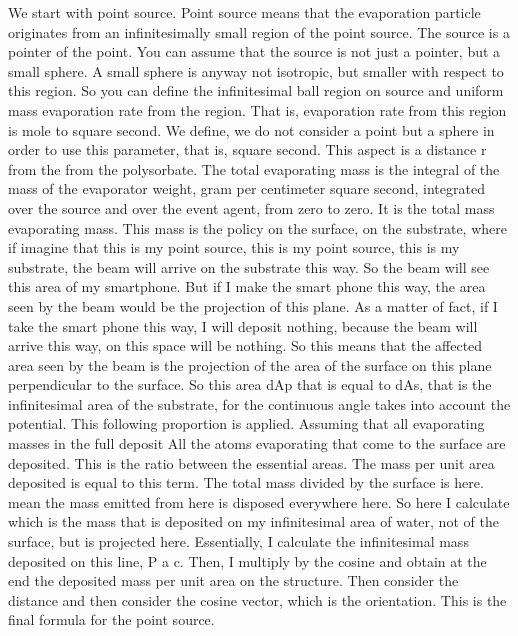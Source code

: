 We start with point source. Point source means that the evaporation particle originates from an infinitesimally small region of the point source. The source is a pointer of the point. You can assume that the source is not just a pointer, but a small sphere. A small sphere is anyway not isotropic, but smaller with respect to this region. So you can define the infinitesimal ball region on source and uniform mass evaporation rate from the region. That is, evaporation rate from this region is mole to square second. We define, we do not consider a point but a sphere in order to use this parameter, that is, square second. This aspect is a distance r from the from the polysorbate. The total evaporating mass is the integral of the mass of the evaporator weight, gram per centimeter square second, integrated over the source and over the event agent, from zero to zero. It is the total mass evaporating mass. This mass is the policy on the surface, on the substrate, where if imagine that this is my point source, this is my point source, this is my substrate, the beam will arrive on the substrate this way. So the beam will see this area of my smartphone. But if I make the smart phone this way, the area seen by the beam would be the projection of this plane. As a matter of fact, if I take the smart phone this way, I will deposit nothing, because the beam will arrive this way, on this space will be nothing. So this means that the affected area seen by the beam is the projection of the area of the surface on this plane perpendicular to the surface. So this area dAp that is equal to dAs, that is the infinitesimal area of the substrate, for the continuous angle takes into account the potential. This following proportion is applied. Assuming that all evaporating masses in the full deposit All the atoms evaporating that come to the surface are deposited. This is the ratio between the essential areas. The mass per unit area deposited is equal to this term. The total mass divided by the surface is here. mean the mass emitted from here is disposed everywhere here. So here I calculate which is the mass that is deposited on my infinitesimal area of water, not of the surface, but is projected here. Essentially, I calculate the infinitesimal mass deposited on this line, P a c. Then, I multiply by the cosine and obtain at the end the deposited mass per unit area on the structure. Then consider the distance and then consider the cosine vector, which is the orientation. This is the final formula for the point source.
